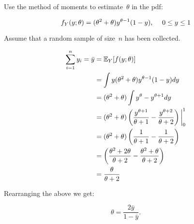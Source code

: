 \begin{problem}
   Use the method of moments to estimate~$\theta$ in the pdf:

  \begin{equation*}
    f_{Y}(y;\theta) = (\theta^{2} + \theta) y^{\theta - 1} (1 - y)\text{,} \hspace{0.5cm} 0 \leq y \leq 1
  \end{equation*}

  \noindent
  Assume that a random sample of size~$n$ has been collected.
\end{problem}

\begin{align*}
  \sum_{i=1}^{n} y_i = \bar{y} &= \mathbb{E}_{Y}\lbrack f(y;\theta)\rbrack \\
                     &= \int  y(\theta^{2} + \theta) y^{\theta - 1} (1 - y) dy \\
                     &= (\theta^{2} + \theta) \int y^{\theta} - y^{\theta + 1} dy \\
                     &= (\theta^{2} + \theta) \left( \frac{y^{\theta + 1}}{\theta + 1} -\frac{y^{\theta + 2}}{\theta + 2} \right)\bigg\vert_{0}^{1} \\
                     &= (\theta^{2} + \theta) \left( \frac{1}{\theta + 1} - \frac{1}{\theta + 2} \right)\\
                     &= \left( \frac{\theta^{2} + 2\theta}{\theta + 2} - \frac{\theta^{2} + \theta}{\theta + 2} \right)\\
                     &= \frac{\theta}{\theta + 2}
\end{align*}

Rearranging the above we get:

\begin{equation}
  \theta = \boxed{\frac{2\bar{y}}{1 - \bar{y}}}.
\end{equation}
